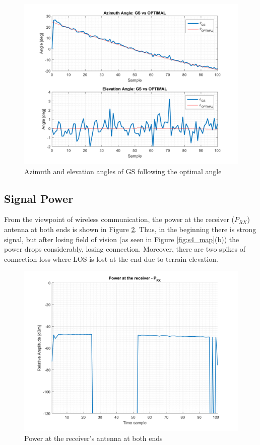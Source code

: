\begin{figure}[H]
	\centering
	\includegraphics[scale=0.8]{figures/s4_gs.png}
	\caption{Azimuth and elevation angles of GS following the optimal angle}
	\label{fig:s4_gs}
\end{figure}

\subsection*{Signal Power}
From the viewpoint of wireless communication, the power at the receiver ($P_{RX}$) antenna at both ends is shown in Figure \ref{fig:s4_power}. Thus, in the beginning there is strong signal, but after losing field of vision (as seen in Figure \ref{fig:s4_map}(b)) the power drops considerably, losing connection. Moreover, there are two spikes of connection loss where LOS is lost at the end due to terrain elevation.

\begin{figure}[H]
	\centering
	\includegraphics[scale=0.8]{figures/s4_power.png}
	\caption{Power at the receiver's antenna at both ends}
	\label{fig:s4_power}
\end{figure}